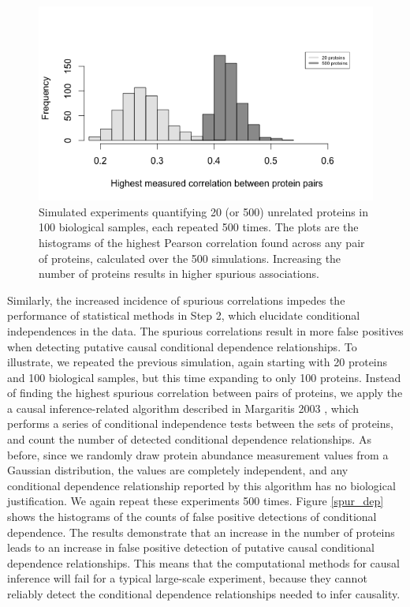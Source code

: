 \documentclass[journal=jacsat,manuscript=article]{achemso}
\begin{document}
\begin{figure}[!tpb]
\centerline{\includegraphics[width=1\textwidth]{figs/spurious_corr.png}}
\caption{Simulated experiments quantifying 20 (or 500) unrelated proteins in 100 biological samples, each repeated 500 times. The plots are the histograms of the highest Pearson correlation found across any pair of proteins, calculated over the 500 simulations. Increasing the number of proteins results in higher spurious associations.}
\label{spur_corr}
\end{figure}

Similarly, the increased incidence of spurious correlations impedes the performance of statistical methods in Step 2, which elucidate conditional independences in the data.  The spurious correlations result in more false positives when detecting putative causal conditional dependence relationships. To illustrate, we repeated the previous simulation, again starting with 20 proteins and 100 biological samples, but this time expanding to only 100 proteins.  Instead of finding the highest  spurious correlation between pairs of proteins, we apply the a causal inference-related algorithm described in Margaritis 2003 \cite{margaritis2003learning}, which performs a series of conditional independence tests between the sets of proteins, and count the number of detected conditional dependence relationships.  As before, since we randomly draw protein abundance measurement values from a Gaussian distribution, the values are completely independent, and any conditional dependence relationship reported by this algorithm has no biological justification.  We again repeat these experiments 500 times. Figure \ref{spur_dep} shows the histograms of the counts of false positive detections of conditional dependence.  The results demonstrate that an increase in the number of proteins leads to an increase in false positive detection of putative causal conditional dependence relationships. This means that the computational methods for causal inference will fail for a typical large-scale experiment, because they cannot reliably detect the conditional dependence relationships needed to infer causality.
\end{document}
